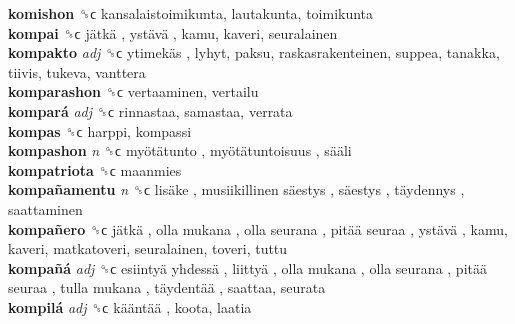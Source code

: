 \textbf{komishon} ␝ϲ  kansalaistoimikunta, lautakunta, toimikunta  \\
\textbf{kompai} ␝ϲ   jätkä ,  ystävä , kamu, kaveri, seuralainen  \\
\textbf{kompakto} \emph{adj}  ␝ϲ   ytimekäs , lyhyt, paksu, raskasrakenteinen, suppea, tanakka, tiivis, tukeva, vanttera  \\
\textbf{komparashon} ␝ϲ  vertaaminen, vertailu  \\
\textbf{kompará} \emph{adj}  ␝ϲ  rinnastaa, samastaa, verrata  \\
\textbf{kompas} ␝ϲ  harppi, kompassi  \\
\textbf{kompashon} \emph{n}  ␝ϲ   myötätunto ,  myötätuntoisuus ,  sääli   \\
\textbf{kompatriota} ␝ϲ  maanmies  \\
\textbf{kompañamentu} \emph{n}  ␝ϲ   lisäke ,  musiikillinen säestys ,  säestys ,  täydennys , saattaminen  \\
\textbf{kompañero} ␝ϲ   jätkä ,  olla mukana ,  olla seurana ,  pitää seuraa ,  ystävä , kamu, kaveri, matkatoveri, seuralainen, toveri, tuttu  \\
\textbf{kompañá} \emph{adj}  ␝ϲ   esiintyä yhdessä ,  liittyä ,  olla mukana ,  olla seurana ,  pitää seuraa ,  tulla mukana ,  täydentää , saattaa, seurata  \\
\textbf{kompilá} \emph{adj}  ␝ϲ   kääntää , koota, laatia  \\
